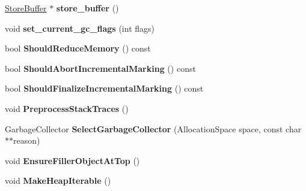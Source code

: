 \begin{DoxyCompactItemize}
\item 
\hyperlink{classv8_1_1internal_1_1_store_buffer}{Store\+Buffer} $\ast$ {\bfseries store\+\_\+buffer} ()\hypertarget{classv8_1_1internal_1_1_heap_a7a0c298ff01a173aa8df4326b75e5717}{}\label{classv8_1_1internal_1_1_heap_a7a0c298ff01a173aa8df4326b75e5717}

\item 
void {\bfseries set\+\_\+current\+\_\+gc\+\_\+flags} (int flags)\hypertarget{classv8_1_1internal_1_1_heap_a8911aff1f7968af8d70dc5326ec35017}{}\label{classv8_1_1internal_1_1_heap_a8911aff1f7968af8d70dc5326ec35017}

\item 
bool {\bfseries Should\+Reduce\+Memory} () const \hypertarget{classv8_1_1internal_1_1_heap_adc70450f2847a587f04e0630045b1b6f}{}\label{classv8_1_1internal_1_1_heap_adc70450f2847a587f04e0630045b1b6f}

\item 
bool {\bfseries Should\+Abort\+Incremental\+Marking} () const \hypertarget{classv8_1_1internal_1_1_heap_a90bf90e5ac3f56bf6b5bbcc13c1d2e55}{}\label{classv8_1_1internal_1_1_heap_a90bf90e5ac3f56bf6b5bbcc13c1d2e55}

\item 
bool {\bfseries Should\+Finalize\+Incremental\+Marking} () const \hypertarget{classv8_1_1internal_1_1_heap_ab4fa97fe77828857878e1cf2d741cd52}{}\label{classv8_1_1internal_1_1_heap_ab4fa97fe77828857878e1cf2d741cd52}

\item 
void {\bfseries Preprocess\+Stack\+Traces} ()\hypertarget{classv8_1_1internal_1_1_heap_a5a927d7073f899c4ac9c886769e54556}{}\label{classv8_1_1internal_1_1_heap_a5a927d7073f899c4ac9c886769e54556}

\item 
Garbage\+Collector {\bfseries Select\+Garbage\+Collector} (Allocation\+Space space, const char $\ast$$\ast$reason)\hypertarget{classv8_1_1internal_1_1_heap_abccb264ce806fa1f7476d289af5e884f}{}\label{classv8_1_1internal_1_1_heap_abccb264ce806fa1f7476d289af5e884f}

\item 
void {\bfseries Ensure\+Filler\+Object\+At\+Top} ()\hypertarget{classv8_1_1internal_1_1_heap_a094598ac77d1ff2578cea1dfc93617cb}{}\label{classv8_1_1internal_1_1_heap_a094598ac77d1ff2578cea1dfc93617cb}

\item 
void {\bfseries Make\+Heap\+Iterable} ()\hypertarget{classv8_1_1internal_1_1_heap_a6988247f29d9ad899b6d8adc5f2bfc7e}{}\label{classv8_1_1internal_1_1_heap_a6988247f29d9ad899b6d8adc5f2bfc7e}


\end{DoxyCompactItemize}
